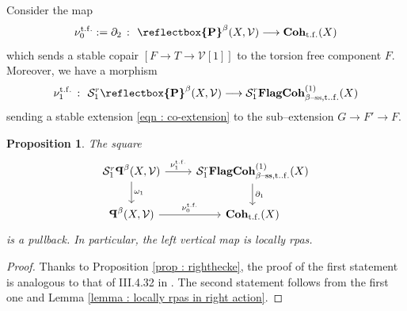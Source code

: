 \documentclass[11pt]{article}
\newtheorem{proposition}[theorem]{Proposition}
\newcommand{\segal}{\mathcal{S}}
\newcommand{\fbetastack}{\boldsymbol{\operatorname{Coh}}_{\operatorname{t.f.}}(X)}
\newcommand{\framing}{\mathcal{V}}
\newcommand{\copairs}{\boldsymbol{\cop}^{\beta}(X,\mathcal{V})}
\newcommand{\cop}{\reflectbox{\ensuremath{\operatorname{P}}}}
\begin{document}
\noindent Consider the map 
\begin{equation}\label{eqn : copair to tf}
    \nu_0^{\operatorname{t.f.}} :=\partial_2 \ \colon \ \copairs \longrightarrow \fbetastack
\end{equation}
which sends a stable copair $[F\rightarrow T \rightarrow \framing[1]]$ to the torsion free component $F$. Moreover, we have a morphism
\begin{equation}
    \nu_1^{\operatorname{t.f.}} \ \colon \ \segal_1^r\copairs \longrightarrow \segal_1^r\boldsymbol{\operatorname{FlagCoh}}^{(1)}_{\operatorname{\beta--ss,t..f.}}(X)
\end{equation}
sending a stable extension \eqref{eqn : co-extension} to the sub--extension $G\rightarrow F'\rightarrow F$.


 \begin{proposition}
            The square
        \begin{equation}\label{eqn : right properness square}
        \begin{tikzcd}
	{\segal_1^r \copairs} & \segal_1^r\boldsymbol{\operatorname{FlagCoh}}^{(1)}_{\operatorname{\beta--ss,t..f.}}(X)\\
	\copairs & \fbetastack
	\arrow[from=1-1, to=1-2 , "\nu_1^{\operatorname{t.f.}}"]
	\arrow[from=1-1, to=2-1, "\omega_1"]
	\arrow[from=1-2, to=2-2, "\partial_1"]
	\arrow[""{name=0, anchor=center, inner sep=0}, from=2-1, to=2-2, "\nu_0^{\operatorname{t.f.}}"]
    \end{tikzcd}
    \end{equation}
    is a pullback. In particular, the left vertical map is locally rpas.
    \end{proposition}

    \begin{proof}
        Thanks to Proposition \ref{prop : righthecke}, the proof of the first statement is analogous to that of III.4.32 in \cite{dps}. The second statement follows from the first one and Lemma \ref{lemma : locally rpas in right action}.
    \end{proof}

    \bigskip
\end{document}
